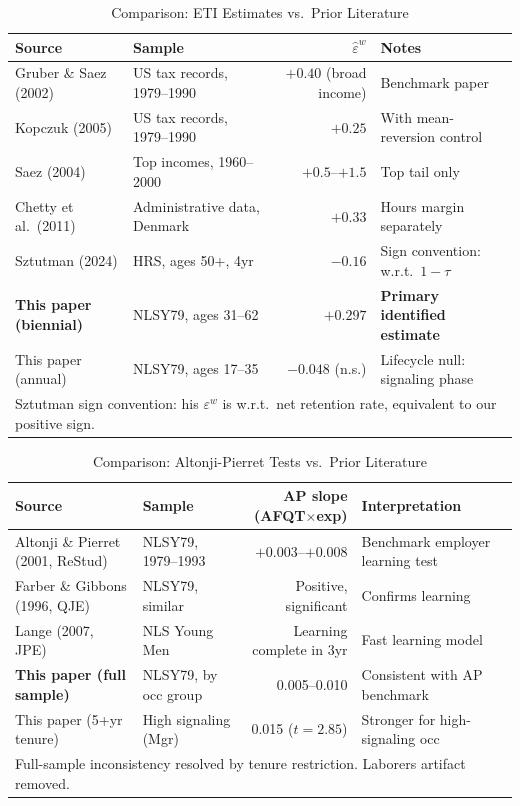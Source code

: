 \documentclass[11pt, letterpaper]{article}
\begin{document}
\begin{table}[h!]
\centering
\caption{Comparison: ETI Estimates vs.\ Prior Literature}
\label{tab:eti_lit}
\begin{tabular}{llrl}
\toprule
Source & Sample & $\hat{\varepsilon}^w$ & Notes \\
\midrule
Gruber \& Saez (2002) & US tax records, 1979--1990 & $+0.40$ (broad income) & Benchmark paper \\
Kopczuk (2005) & US tax records, 1979--1990 & $+0.25$ & With mean-reversion control \\
Saez (2004) & Top incomes, 1960--2000 & $+0.5$--$+1.5$ & Top tail only \\
Chetty et al.\ (2011) & Administrative data, Denmark & $+0.33$ & Hours margin separately \\
Sztutman (2024) & HRS, ages 50+, 4yr & $-0.16$ & Sign convention: w.r.t.\ $1-\tau$ \\
\midrule
\textbf{This paper (biennial)} & NLSY79, ages 31--62 & $\mathbf{+0.297}$ & \textbf{Primary identified estimate} \\
This paper (annual) & NLSY79, ages 17--35 & $-0.048$ (n.s.) & Lifecycle null: signaling phase \\
\bottomrule
\multicolumn{4}{l}{\footnotesize Sztutman sign convention: his $\varepsilon^w$ is w.r.t.\ net retention rate, equivalent to our positive sign.}
\end{tabular}
\end{table}

\begin{table}[h!]
\centering
\caption{Comparison: Altonji-Pierret Tests vs.\ Prior Literature}
\label{tab:ap_lit}
\begin{tabular}{llrl}
\toprule
Source & Sample & AP slope (AFQT$\times$exp) & Interpretation \\
\midrule
Altonji \& Pierret (2001, ReStud) & NLSY79, 1979--1993 & $+0.003$--$+0.008$ & Benchmark employer learning test \\
Farber \& Gibbons (1996, QJE) & NLSY79, similar & Positive, significant & Confirms learning \\
Lange (2007, JPE) & NLS Young Men & Learning complete in 3yr & Fast learning model \\
\midrule
\textbf{This paper (full sample)} & NLSY79, by occ group & 0.005--0.010 & Consistent with AP benchmark \\
This paper (5+yr tenure) & High signaling (Mgr) & 0.015 ($t = 2.85$) & Stronger for high-signaling occ \\
\bottomrule
\multicolumn{4}{l}{\footnotesize Full-sample inconsistency resolved by tenure restriction. Laborers artifact removed.}
\end{tabular}
\end{table}
\end{document}
